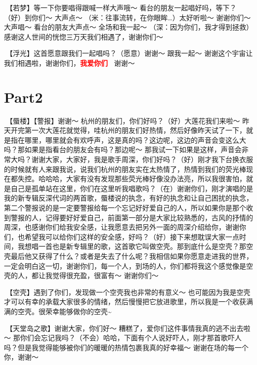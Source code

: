 \documentclass[
]{book}
\begin{document}
🎵【若梦】等一下你要唱得跟喊一样大声哦～ 看台的朋友一起唱好吗，等下？（好）到你们～ 大声点～ （米：往事流转，在你眼眸\ldots）太好听啦～ 谢谢你们～ 大声唱～ 看台的朋友大声点～ 全场和我一起～ （深：因为你们，我才得到拯救）
感谢这人世间的恍惚三万天我们相遇了，谢谢你们～

🎵【浮光】这首愿意跟我们一起唱吗？（愿意）谢谢～ 跟我一起～ 谢谢这个宇宙让我们相遇啦，谢谢你们，\textbf{\textcolor{red}{我爱你们~} } 谢谢～

\section{Part2}\label{hangzhou-20240824-part2}

🎵【蜃楼】【警报】谢谢～
杭州的朋友们，你们好吗？（好）大莲花我们来啦～ 昨天开完第一次大莲花就觉得，哇杭州的朋友们好热情，然后好像昨天试了一下，就是指在哪里，哪里就会有欢呼声，这是真的吗？这边呢，这边的声音会变这么大吗？那如果是指看台的朋友会有吗？那边呢～ 那我试一下如果是这样，声音会非常大吗？谢谢大家，大家好，我是歌手周深，你们好吗？（好）刚才我下台换衣服的时候就有人来跟我说，说我们杭州的朋友实在太热情了，热情到我们的荧光棒现在都失控。哈哈哈，大家有没有发现那些荧光棒好像没办法亮，所以我很害怕，就是自己是孤单站在这里，你们在这里听我唱歌吗？（在）谢谢你们，刚才演唱的是我的新专辑反深代词的两首歌，蜃楼说的执念，有好的执念和让自己困扰的执念，第二个警报说的是一定要警报给每一个忘记好好爱自己的人，所以如果你是那个收到警报的人，记得要好好爱自己，前面第一部分是大家比较熟悉的，古风的抒情的周深，也感谢你们给我安全感，让我愿意去把另外一面的周深介绍给你，谢谢你们，也希望我可以给你们这样的安全感，好吗？（好）接下来想耽误大家一点时间，我想唱一首也是新专辑里的歌，这首歌它叫做空壳。那到底什么是空壳？那空壳最后他又获得了什么？或者是失去了什么呢？我相信如果你愿意走进我的世界，一定会明白这一切，谢谢你们，每一个人，到场的人，你们都将我这个感觉像是空壳的人，都让我觉得很充盈，很富有～ 谢谢你们～

🎵【空壳】遇到了你们，发现做一个空壳我也非常的有意义～ 也可能因为我是空壳才可以有幸的承载大家很多的情绪，然后慢慢把它放进歌里，所以我是一个收获满满的空壳。很荣幸能够做你的空壳\textasciitilde{}

🎵【天堂岛之歌】谢谢大家，你们好～ 糟糕了，爱你们这件事情我真的逃不出去啦～ 那你们会忘记我吗？（不会）哈哈，下面有个人说好吓人，刚才那首歌吓人吗？但是我觉得能够被你们的暖暖的热情包裹我真的好幸福～ 谢谢在场的每一个你，谢谢～
\end{document}
